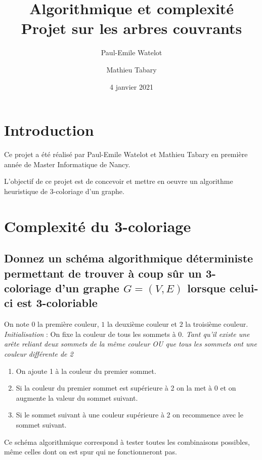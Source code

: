 \documentclass[a4paper, 11pt]{article}
\title{Algorithmique et complexité Projet sur les arbres couvrants}
\author{Paul-Emile Watelot \and Mathieu Tabary}
\date{4 janvier 2021}
\begin{document}
    \maketitle
    \newpage
    \tableofcontents
    \newpage

    \section{Introduction}\label{sec:introduction}

    Ce projet a été réalisé par Paul-Emile Watelot et Mathieu Tabary en première année de Master Informatique de Nancy.

    L'objectif de ce projet est de concevoir et mettre en oeuvre un algorithme heuristique de 3-coloriage d'un graphe.

    \section{Complexité du 3-coloriage}\label{sec:complexite-du-3-coloriage}

    \subsection{Donnez un schéma algorithmique déterministe permettant de trouver à coup sûr un 3-coloriage d'un graphe
    $G=(V, E)$ lorsque celui-ci est 3-coloriable}\label{subsec:Q2A}

    On note $0$ la première couleur, $1$ la deuxième couleur et $2$ la troisième couleur.
    \emph{Initialisation} : On fixe la couleur de tous les sommets à 0.
    \emph{Tant qu'il existe une arête reliant deux sommets de la même couleur OU que tous les sommets ont une couleur différente de 2}
    \begin{enumerate}
        \item On ajoute 1 à la couleur du premier sommet.
        \item Si la couleur du premier sommet est supérieure à 2 on la met à 0 et on augmente la valeur du sommet suivant.
        \item Si le sommet suivant à une couleur supérieure à 2 on recommence avec le sommet suivant.
    \end{enumerate}

    Ce schéma algorithmique correspond à tester toutes les combinaisons possibles, même celles dont on est spur qui ne fonctionneront pas.
\end{document}
